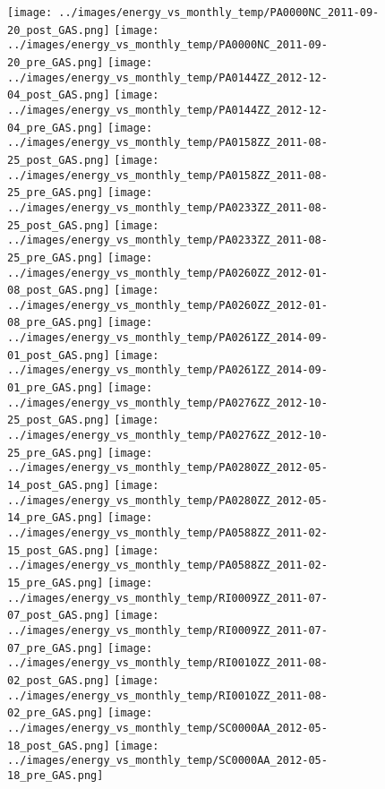 \clearpage
\begin{figure}
\centering
\texttt{[image: ../images/energy\_vs\_monthly\_temp/PA0000NC\_2011-09-20\_post\_GAS.png]}
\texttt{[image: ../images/energy\_vs\_monthly\_temp/PA0000NC\_2011-09-20\_pre\_GAS.png]}
\texttt{[image: ../images/energy\_vs\_monthly\_temp/PA0144ZZ\_2012-12-04\_post\_GAS.png]}
\texttt{[image: ../images/energy\_vs\_monthly\_temp/PA0144ZZ\_2012-12-04\_pre\_GAS.png]}
\texttt{[image: ../images/energy\_vs\_monthly\_temp/PA0158ZZ\_2011-08-25\_post\_GAS.png]}
\texttt{[image: ../images/energy\_vs\_monthly\_temp/PA0158ZZ\_2011-08-25\_pre\_GAS.png]}
\texttt{[image: ../images/energy\_vs\_monthly\_temp/PA0233ZZ\_2011-08-25\_post\_GAS.png]}
\texttt{[image: ../images/energy\_vs\_monthly\_temp/PA0233ZZ\_2011-08-25\_pre\_GAS.png]}
\texttt{[image: ../images/energy\_vs\_monthly\_temp/PA0260ZZ\_2012-01-08\_post\_GAS.png]}
\texttt{[image: ../images/energy\_vs\_monthly\_temp/PA0260ZZ\_2012-01-08\_pre\_GAS.png]}
\texttt{[image: ../images/energy\_vs\_monthly\_temp/PA0261ZZ\_2014-09-01\_post\_GAS.png]}
\texttt{[image: ../images/energy\_vs\_monthly\_temp/PA0261ZZ\_2014-09-01\_pre\_GAS.png]}
\texttt{[image: ../images/energy\_vs\_monthly\_temp/PA0276ZZ\_2012-10-25\_post\_GAS.png]}
\texttt{[image: ../images/energy\_vs\_monthly\_temp/PA0276ZZ\_2012-10-25\_pre\_GAS.png]}
\texttt{[image: ../images/energy\_vs\_monthly\_temp/PA0280ZZ\_2012-05-14\_post\_GAS.png]}
\texttt{[image: ../images/energy\_vs\_monthly\_temp/PA0280ZZ\_2012-05-14\_pre\_GAS.png]}
\texttt{[image: ../images/energy\_vs\_monthly\_temp/PA0588ZZ\_2011-02-15\_post\_GAS.png]}
\texttt{[image: ../images/energy\_vs\_monthly\_temp/PA0588ZZ\_2011-02-15\_pre\_GAS.png]}
\texttt{[image: ../images/energy\_vs\_monthly\_temp/RI0009ZZ\_2011-07-07\_post\_GAS.png]}
\texttt{[image: ../images/energy\_vs\_monthly\_temp/RI0009ZZ\_2011-07-07\_pre\_GAS.png]}
\texttt{[image: ../images/energy\_vs\_monthly\_temp/RI0010ZZ\_2011-08-02\_post\_GAS.png]}
\texttt{[image: ../images/energy\_vs\_monthly\_temp/RI0010ZZ\_2011-08-02\_pre\_GAS.png]}
\texttt{[image: ../images/energy\_vs\_monthly\_temp/SC0000AA\_2012-05-18\_post\_GAS.png]}
\texttt{[image: ../images/energy\_vs\_monthly\_temp/SC0000AA\_2012-05-18\_pre\_GAS.png]}
\end{figure}
